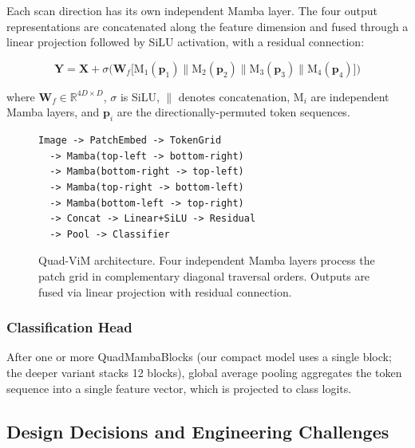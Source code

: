 \documentclass[conference]{IEEEtran}
\begin{document}
Each scan direction has its own independent Mamba layer. The four output representations are concatenated along the feature dimension and fused through a linear projection followed by SiLU activation, with a residual connection:

\begin{equation}
\mathbf{Y} = \mathbf{X} + \sigma\!\Big(\mathbf{W}_f \big[\text{M}_1(\mathbf{p}_1) \| \text{M}_2(\mathbf{p}_2) \| \text{M}_3(\mathbf{p}_3) \| \text{M}_4(\mathbf{p}_4)\big]\Big)
\label{eq:quad}
\end{equation}

\noindent where $\mathbf{W}_f \in \mathbb{R}^{4D \times D}$, $\sigma$ is SiLU, $\|$ denotes concatenation, $\text{M}_i$ are independent Mamba layers, and $\mathbf{p}_i$ are the directionally-permuted token sequences.

\begin{figure}[t]
\centering
\small
\begin{verbatim}
Image -> PatchEmbed -> TokenGrid
  -> Mamba(top-left -> bottom-right)
  -> Mamba(bottom-right -> top-left)
  -> Mamba(top-right -> bottom-left)
  -> Mamba(bottom-left -> top-right)
  -> Concat -> Linear+SiLU -> Residual
  -> Pool -> Classifier
\end{verbatim}
\caption{Quad-ViM architecture. Four independent Mamba layers process the patch grid in complementary diagonal traversal orders. Outputs are fused via linear projection with residual connection.}
\label{fig:quad_scan}
\end{figure}

\subsubsection{Classification Head}
After one or more QuadMambaBlocks (our compact model uses a single block; the deeper variant stacks 12 blocks), global average pooling aggregates the token sequence into a single feature vector, which is projected to class logits.

\subsection{Design Decisions and Engineering Challenges}
\end{document}
